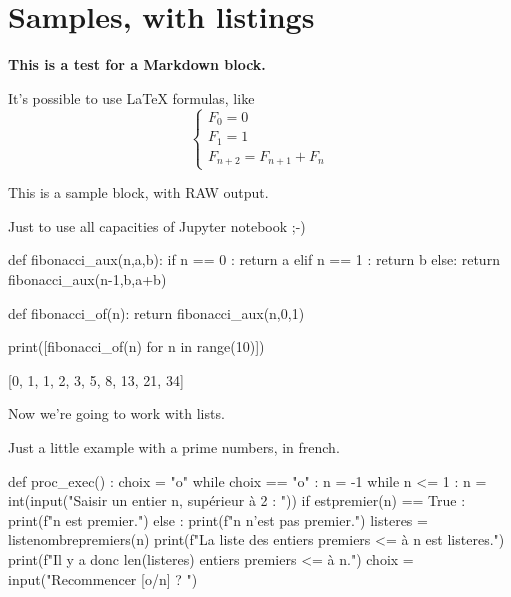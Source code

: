 \documentclass[english,11pt,a4paper]{article}
\begin{document}
\section{Samples, with listings}

\begin{NotebookMarkdown}{\linewidth}
{\Large\bfseries This is a test for a \textsf{Markdown} block.}

It's possible to use \LaTeX{} formulas, like %
\[
\left\lbrace\begin{array}{l}
	F_0 = 0\\
	F_1 = 1 \\
	F_{n+2} = F_{n+1} + F_n
\end{array}\right.
\]
\end{NotebookMarkdown}

\begin{NotebookRaw}{\linewidth}
This is a sample block, with RAW output.

Just to use all capacities of Jupyter notebook ;-)
\end{NotebookRaw}

\begin{NotebookIn}{\linewidth}
def fibonacci_aux(n,a,b):
	if n == 0 :
		return a
	elif n == 1 :
		return b
	else:
		return fibonacci_aux(n-1,b,a+b)

def fibonacci_of(n):
	return fibonacci_aux(n,0,1)

print([fibonacci_of(n) for n in range(10)])
\end{NotebookIn}

\begin{NotebookOut}{\linewidth}
[0, 1, 1, 2, 3, 5, 8, 13, 21, 34]
\end{NotebookOut}

\begin{NotebookRaw}{\linewidth}
Now we’re going to work with lists.

Just a little example with a prime numbers, in french.
\end{NotebookRaw}

\begin{NotebookIn}{\linewidth}
def proc_exec() :
	choix = "o"
	while choix == "o" :
		n = -1
		while n <= 1 :
			n = int(input("Saisir un entier n, supérieur à 2 : "))
		if estpremier(n) == True :
			print(f"{n} est premier.")
		else :
			print(f"{n} n'est pas premier.")
		listeres = listenombrepremiers(n)
		print(f"La liste des entiers premiers <= à {n} est {listeres}.")
		print(f"Il y a donc {len(listeres)} entiers premiers <= à {n}.")
		choix = input("Recommencer [o/n] ? ")
\end{NotebookIn}
\end{document}

